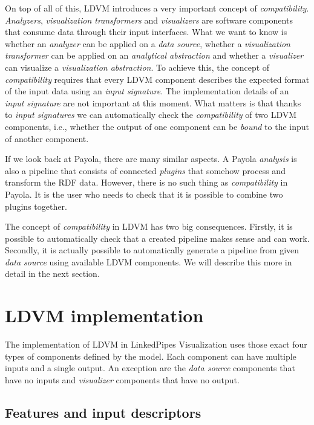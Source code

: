 On top of all of this, LDVM introduces a very important concept of \emph{compatibility}. \emph{Analyzers}, \emph{visualization transformers} and \emph{visualizers} are software components that consume data through their input interfaces. What we want to know is whether an \emph{analyzer} can be applied on a \emph{data source}, whether a \emph{visualization transformer} can be applied on an \emph{analytical abstraction} and whether a \emph{visualizer} can visualize a \emph{visualization abstraction}. To achieve this, the concept of \emph{compatibility} requires that every LDVM component describes the expected format of the input data using an \emph{input signature}. The implementation details of an \emph{input signature} are not important at this moment. What matters is that thanks to \emph{input signatures} we can automatically check the \emph{compatibility} of two LDVM components, i.e., whether the output of one component can be \emph{bound} to the input of another component.

If we look back at Payola, there are many similar aspects. A Payola \emph{analysis} is also a pipeline that consists of connected \emph{plugins} that somehow process and transform the RDF data. However, there is no such thing as \emph{compatibility} in Payola. It is the user who needs to check that it is possible to combine two plugins together.

The concept of \emph{compatibility} in LDVM has two big consequences. Firstly, it is possible to automatically check that a created pipeline makes sense and can work. Secondly, it is actually possible to automatically generate a pipeline from given \emph{data source} using available LDVM components. We will describe this more in detail in the next section.

\section{LDVM implementation}

The implementation of LDVM in LinkedPipes Visualization \cite{ldvm_use_cases} uses those exact four types of components defined by the model. Each component can have multiple inputs and a single output. An exception are the \emph{data source} components that have no inputs and \emph{visualizer} components that have no output. 

\subsection{Features and input descriptors}

